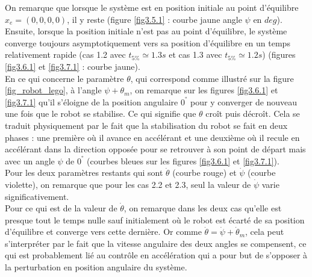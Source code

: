 \documentclass[a4paper]{article}
\begin{document}
                        On remarque que lorsque le système est en position initiale au point d'équilibre $x_e=(0,0,0,0)$, il y reste
                        (figure \ref{fig3.5.1} : courbe jaune angle $\psi$ en $deg$). 
                        Ensuite, lorsque la position initiale n'est pas au point d'équilibre, le système converge toujours asymptotiquement vers
                        sa position d'équilibre en un temps relativement rapide (cas 1.2 avec $t_{5\%} \simeq 1.3s$ et cas 1.3 avec $t_{5\%} \simeq 1.2s$)
                        (figures \ref{fig3.6.1} et \ref{fig3.7.1} : courbe jaune). \\

                        En ce qui concerne le paramètre $\theta$, qui correspond comme illustré sur la figure \ref{fig_robot_lego},
                        à l'angle $\psi + \theta_m$, on remarque sur les figures \ref{fig3.6.1} et \ref{fig3.7.1} qu'il s'éloigne de la
                        position angulaire $0^{°}$ pour y converger de nouveau une fois que le robot se stabilise. Ce qui signifie que $\theta$ croît puis décroît.
                        Cela se traduit physiquement par le fait que la stabilisation du robot se fait en deux phases : une première où il avance en accélérant
                        et une deuxième où il recule en accélérant dans la direction opposée pour se retrouver à son point de départ mais avec un angle
                        $\psi$ de $0^{°}$ (courbes bleues sur les figures \ref{fig3.6.1} et \ref{fig3.7.1}). \\

                        Pour les deux paramètres restants qui sont $\dot \theta$ (courbe rouge) et $\dot \psi$ (courbe violette), on remarque que pour les cas 2.2 et 2.3, 
                        seul la valeur de $\dot \psi$ varie significativement. \\

                        Pour ce qui est de la valeur de $\dot \theta$, on remarque dans les deux cas qu'elle est presque tout le temps nulle sauf initialement où
                        le robot est écarté de sa position d'équilibre et converge vers cette dernière.
                        Or comme $\dot \theta = \dot \psi + \dot \theta_m$, cela peut s'interpréter par le fait que la vitesse angulaire des deux angles se compensent,
                        ce qui est probablement lié au contrôle en accélération qui a pour but de s'opposer à la perturbation en position angulaire du système. \\
\end{document}
